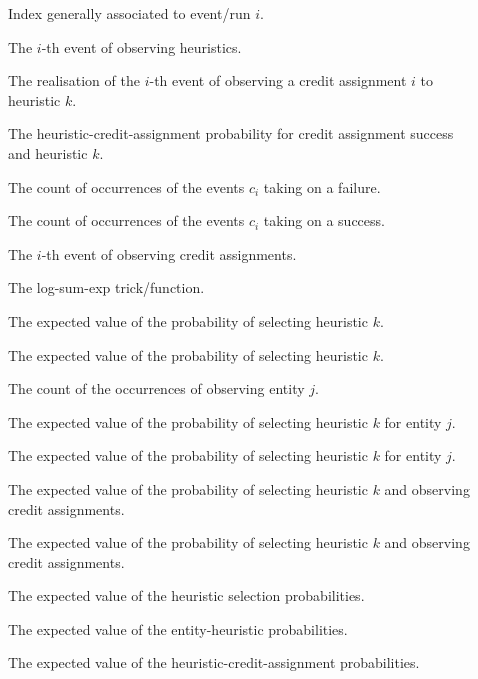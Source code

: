 \begin{description}
	\item [\parbox{2cm}{$i$}] Index generally associated to event/run $i$.
	\item [\parbox{2cm}{$h_{i}$}] The $i$-th event of observing heuristics.
	\item [\parbox{2cm}{$c_{i,k}$}] The realisation of the $i$-th event of observing a credit assignment $i$ to heuristic $k$.
	\item [\parbox{2cm}{$\psi_{k}$}] The heuristic-credit-assignment probability for credit assignment success and heuristic $k$.
	\item [\parbox{2cm}{$N_{0,k}$}] The count of occurrences of the events $c_{i}$ taking on a failure.
	\item [\parbox{2cm}{$N_{1,k}$}] The count of occurrences of the events $c_{i}$ taking on a success.
	\item [\parbox{2cm}{$c_{i}$}] The $i$-th event of observing credit assignments.
	\item [\parbox{2cm}{$LSE$}] The log-sum-exp trick/function.
	\item [\parbox{2cm}{$\hat{\theta}_{k}$}] The expected value of the probability of selecting heuristic $k$.
	\item [\parbox{2cm}{$E[\theta_{k}]$}] The expected value of the probability of selecting heuristic $k$.
	\item [\parbox{2cm}{$N_{j}$}] The count of the occurrences of observing entity $j$.
	\item [\parbox{2cm}{$\hat{\phi}_{j,k}$}] The expected value of the probability of selecting heuristic $k$ for entity $j$.
	\item [\parbox{2cm}{$E[\phi_{j,k}]$}] The expected value of the probability of selecting heuristic $k$ for entity $j$.
	\item [\parbox{2cm}{$\hat{\psi}_{k}$}] The expected value of the probability of selecting heuristic $k$ and observing credit assignments.
	\item [\parbox{2cm}{$E[\psi_{k}]$}] The expected value of the probability of selecting heuristic $k$ and observing credit assignments.
	\item [\parbox{2cm}{$\boldsymbol{\hat{\theta}}$}] The expected value of the heuristic selection probabilities.
	\item [\parbox{2cm}{$\boldsymbol{\hat{\phi}}$}] The expected value of the entity-heuristic probabilities.
	\item [\parbox{2cm}{$\boldsymbol{\hat{\psi}}$}] The expected value of the heuristic-credit-assignment probabilities.

\end{description}

